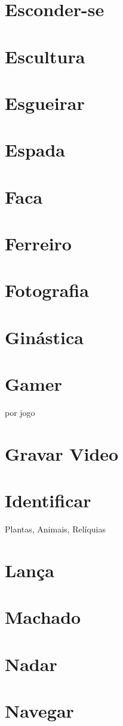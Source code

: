 \section{Esconder-se}
\section{Escultura}
\section{Esgueirar}
\section{Espada}
\section{Faca}
\section{Ferreiro}
\section{Fotografia}
\section{Ginástica}
\section{Gamer} por jogo
\section{Gravar Video}
\section{Identificar} Plantas, Animais, Relíquias
\section{Lança}
\section{Machado}
\section{Nadar}
\section{Navegar}

